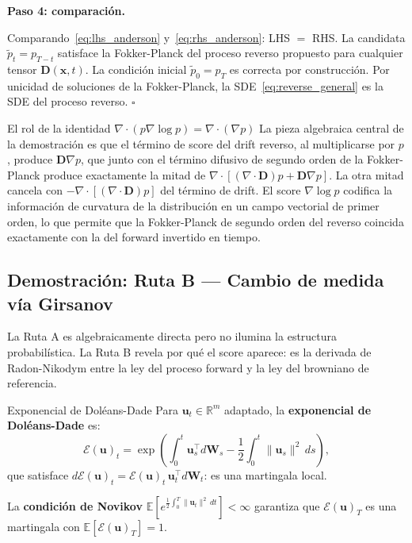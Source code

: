\medskip
\noindent\textbf{Paso 4: comparación.}

Comparando~\eqref{eq:lhs_anderson} y~\eqref{eq:rhs_anderson}: LHS $=$ RHS.
La candidata $\tilde{p}_t = p_{T-t}$ satisface la Fokker-Planck del proceso
reverso propuesto para cualquier tensor $\bm{D}(\bm{x},t)$. La condición
inicial $\tilde{p}_0 = p_T$ es correcta por construcción. Por unicidad de
soluciones de la Fokker-Planck, la SDE~\eqref{eq:reverse_general} es la SDE
del proceso reverso. $\square$

\begin{observacion}{El rol de la identidad $\nabla\cdot(p\nabla\log p) = \nabla\cdot(\nabla p)$}
La pieza algebraica central de la demostración es que el término de score del
drift reverso, al multiplicarse por $p$, produce $\bm{D}\nabla p$, que junto
con el término difusivo de segundo orden de la Fokker-Planck produce exactamente
la mitad de $\nabla\cdot[(\nabla\cdot\bm{D})p + \bm{D}\nabla p]$. La otra
mitad cancela con $-\nabla\cdot[(\nabla\cdot\bm{D})p]$ del término de drift.
El score $\nabla\log p$ codifica la información de curvatura de la distribución
en un campo vectorial de primer orden, lo que permite que la Fokker-Planck de
segundo orden del reverso coincida exactamente con la del forward invertido en
tiempo.
\end{observacion}

\subsection{Demostración: Ruta B — Cambio de medida vía Girsanov}
\label{subsec:anderson_ruta_b}

La Ruta A es algebraicamente directa pero no ilumina la estructura probabilística.
La Ruta B revela por qué el score aparece: es la derivada de Radon-Nikodym entre
la ley del proceso forward y la ley del browniano de referencia.

\begin{definicion}{Exponencial de Doléans-Dade}
\label{def:doleans}
Para $\bm{u}_t \in \mathbb{R}^m$ adaptado, la \textbf{exponencial de
Doléans-Dade} es:
\[
  \mathcal{E}(\bm{u})_t
  = \exp\!\left(\int_0^t \bm{u}_s^\top d\bm{W}_s
    - \frac{1}{2}\int_0^t \|\bm{u}_s\|^2\,ds\right),
\]
que satisface $d\mathcal{E}(\bm{u})_t = \mathcal{E}(\bm{u})_t\,\bm{u}_t^\top
d\bm{W}_t$: es una martingala local.
\end{definicion}

La \textbf{condición de Novikov} $\mathbb{E}\!\left[e^{\frac{1}{2}\int_0^T
\|\bm{u}_t\|^2\,dt}\right] < \infty$ garantiza que $\mathcal{E}(\bm{u})_T$
es una martingala con $\mathbb{E}[\mathcal{E}(\bm{u})_T] = 1$.


